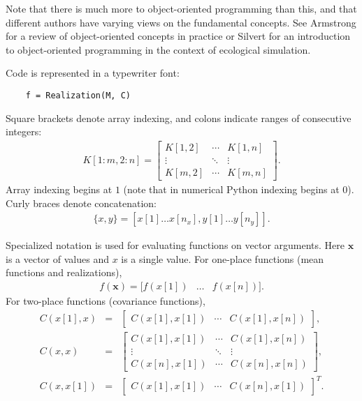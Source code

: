 \documentclass{report}
\begin{document}
Note that there is much more to object-oriented programming than this, and that different authors have varying views on the fundamental concepts. See Armstrong \cite{OOP_review} for a review of object-oriented concepts in practice or Silvert \cite{silvert_OOP} for an introduction to object-oriented programming in the context of ecological simulation. 

\medskip
Code is represented in a typewriter font: 
\begin{verbatim}
    f = Realization(M, C)
\end{verbatim}
Square brackets denote array indexing, and colons indicate ranges of consecutive integers:
\begin{eqnarray*}
    K[1:m,2:n] = \left[\begin{array}{ccc}
    K[1,2]&\cdots&K[1,n]\\
    \vdots&\ddots&\vdots\\
    K[m,2]&\cdots&K[m,n]
    \end{array}\right].
\end{eqnarray*}
Array indexing begins at $1$ (note that in numerical Python indexing begins at 0). Curly braces denote concatenation:
\begin{eqnarray}
    \{x,y\} = [x[1]\ldots x[n_x], y[1]\ldots y[n_y]].
\end{eqnarray}

Specialized notation is used for evaluating functions on vector arguments. Here $\mathbf x$ is a vector of values and $x$ is a single value. For one-place functions (mean functions and realizations),
\begin{eqnarray}
    f(\mathbf x) = [f(x[1])&\ldots&f(x[n])].
\end{eqnarray}
For two-place functions (covariance functions),
\begin{equation}
    \begin{array}{lll}
        C(x[1], x) &=& \left[
        \begin{array}{ccc}
            C(x[1], x[1]) & \cdots & C(x[1], x[n])
        \end{array}
        \right],\\
        C( x, x) & = &\left[
        \begin{array}{ccc}
            C( x[1], x[1]) & \cdots & C( x[1], x[n]) \\\vdots & \ddots & \vdots \\C( x[n], x[1]) & \cdots & C( x[n], x[n])
        \end{array}
        \right],\\
        C( x,x[1]) & = &\left[
        \begin{array}{ccc}
            C(x[1],x[1]) &\cdots& C(x[n],x[1])
        \end{array}
        \right]^T.
    \end{array}
\end{equation}
\end{document}
